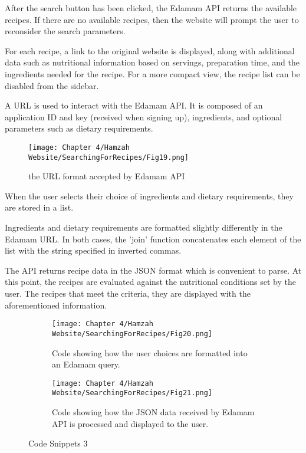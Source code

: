 After the search button has been clicked, the Edamam API returns the available recipes.
If there are no available recipes, then the website will prompt the user to reconsider the search parameters.

For each recipe, a link to the original website is displayed, along with additional data such as nutritional information based on servings, preparation time, and the ingredients needed for the recipe.
For a more compact view, the recipe list can be disabled from the sidebar.

A URL is used to interact with the Edamam API.
It is composed of an application ID and key (received when signing up), ingredients, and optional parameters such as dietary requirements.

\begin{figure}[H]        
    \centering
    \texttt{[image: Chapter 4/Hamzah Website/SearchingForRecipes/Fig19.png]}
    \caption{the URL format accepted by Edamam API}
\end{figure} 

When the user selects their choice of ingredients and dietary requirements, they are stored in a list.

Ingredients and dietary requirements are formatted slightly differently in the Edamam URL.
In both cases, the 'join' function concatenates each element of the list with the string specified in inverted commas.

The API returns recipe data in the JSON format which is convenient to parse.
At this point, the recipes are evaluated against the nutritional conditions set by the user.
The recipes that meet the criteria, they are displayed with the aforementioned information.

\begin{figure}[H]
    \begin{subfigure}{.5\textwidth}
        \centering
        \texttt{[image: Chapter 4/Hamzah Website/SearchingForRecipes/Fig20.png]}
        \caption{Code showing how the user choices are formatted into an Edamam query.}
    \end{subfigure}%
    \begin{subfigure}{.5\textwidth}
        \centering
        \texttt{[image: Chapter 4/Hamzah Website/SearchingForRecipes/Fig21.png]}
        \caption{Code showing how the JSON data received by Edamam API is processed and displayed to the user.}
    \end{subfigure}
    \caption{Code Snippets 3}
\end{figure}

